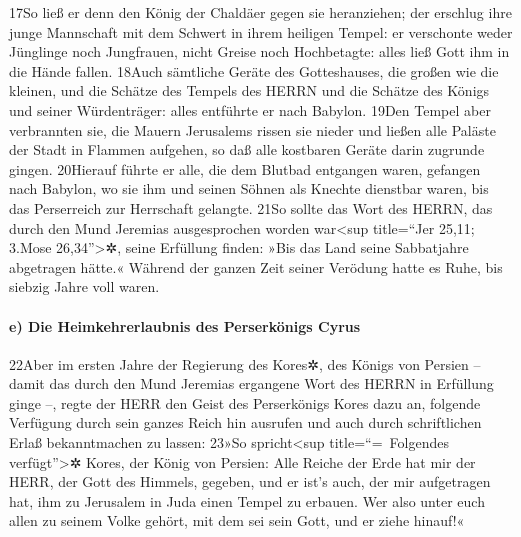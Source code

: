 17So ließ er denn den König der Chaldäer gegen sie heranziehen; der
erschlug ihre junge Mannschaft mit dem Schwert in ihrem heiligen Tempel:
er verschonte weder Jünglinge noch Jungfrauen, nicht Greise noch
Hochbetagte: alles ließ Gott ihm in die Hände fallen. 18Auch sämtliche
Geräte des Gotteshauses, die großen wie die kleinen, und die Schätze des
Tempels des HERRN und die Schätze des Königs und seiner Würdenträger:
alles entführte er nach Babylon. 19Den Tempel aber verbrannten sie, die
Mauern Jerusalems rissen sie nieder und ließen alle Paläste der Stadt in
Flammen aufgehen, so daß alle kostbaren Geräte darin zugrunde gingen.
20Hierauf führte er alle, die dem Blutbad entgangen waren, gefangen nach
Babylon, wo sie ihm und seinen Söhnen als Knechte dienstbar waren, bis
das Perserreich zur Herrschaft gelangte. 21So sollte das Wort des HERRN,
das durch den Mund Jeremias ausgesprochen worden war\textless sup
title=``Jer 25,11; 3.Mose 26,34''\textgreater✲, seine Erfüllung finden:
»Bis das Land seine Sabbatjahre abgetragen hätte.« Während der ganzen
Zeit seiner Verödung hatte es Ruhe, bis siebzig Jahre voll waren.

\hypertarget{e-die-heimkehrerlaubnis-des-perserkuxf6nigs-cyrus}{%
\paragraph{e) Die Heimkehrerlaubnis des Perserkönigs
Cyrus}\label{e-die-heimkehrerlaubnis-des-perserkuxf6nigs-cyrus}}

22Aber im ersten Jahre der Regierung des Kores✲, des Königs von Persien
-- damit das durch den Mund Jeremias ergangene Wort des HERRN in
Erfüllung ginge --, regte der HERR den Geist des Perserkönigs Kores dazu
an, folgende Verfügung durch sein ganzes Reich hin ausrufen und auch
durch schriftlichen Erlaß bekanntmachen zu lassen: 23»So
spricht\textless sup title=``=~Folgendes verfügt''\textgreater✲ Kores,
der König von Persien: Alle Reiche der Erde hat mir der HERR, der Gott
des Himmels, gegeben, und er ist's auch, der mir aufgetragen hat, ihm zu
Jerusalem in Juda einen Tempel zu erbauen. Wer also unter euch allen zu
seinem Volke gehört, mit dem sei sein Gott, und er ziehe hinauf!«
